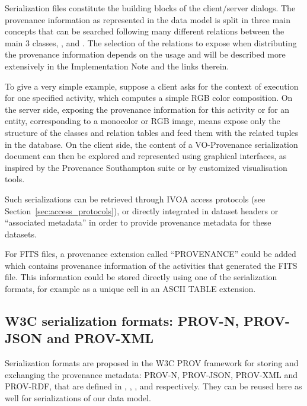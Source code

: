 
Serialization files constitute the building blocks of the client/server dialogs.
The provenance information as represented in the data model is split in three main concepts that can be searched following many different relations between the main 3 classes, ,  and .
The selection of the relations to expose when distributing the provenance information depends on the usage and will be described more extensively in the Implementation Note \citep{std:ProvenanceImplementationNote} and the links therein.

To give a very simple example, suppose a client asks for the context of execution for one specified activity, which computes a simple RGB color composition. 
On the server side, exposing the provenance information for this activity or for an entity, corresponding to a monocolor or RGB image, 
means expose only the structure of the classes
and relation tables and feed them with the related tuples in the database.
On the client side, the content of a VO-Provenance serialization document can then be explored and represented using graphical interfaces, as inspired by the Provenance Southampton suite or by customized visualisation tools.

Such serializations can be retrieved through IVOA access protocols (see Section~\ref{sec:access_protocols}), %
or directly integrated in dataset headers or ``associated metadata'' in order to provide provenance metadata for these datasets. 

For FITS files, a provenance extension called ``PROVENANCE'' could be added which contains provenance information of the activities that generated the FITS file. This information could be stored directly using one of the serialization formats, for example as a unique cell in an ASCII TABLE extension.




\subsection{W3C serialization formats: PROV-N, PROV-JSON and PROV-XML}

Serialization formats are proposed in the W3C PROV framework for storing and exchanging the provenance metadata: {PROV-N}, {PROV-JSON}, {PROV-XML} and PROV-RDF, that are defined in \cite{std:PROV-N}, \cite{std:PROV-JSON}, \cite{std:PROV-XML}, and \cite{std:PROV-O} respectively. 
They can be reused here as well for serializations of our data model. 


